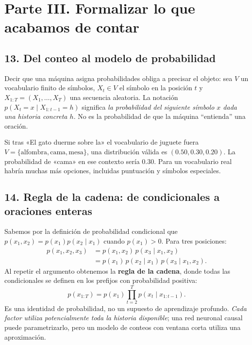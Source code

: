\chapter*{Parte III. Formalizar lo que acabamos de contar}
\section*{13. Del conteo al modelo de probabilidad}
Decir que una máquina asigna probabilidades obliga a precisar el objeto: sea $V$ un vocabulario finito de símbolos, $X_t\in V$ el símbolo en la posición $t$ y $X_{1:T}=(X_1,\ldots,X_T)$ una secuencia aleatoria. La notación $p(X_t=x\mid X_{1:t-1}=h)$ significa \emph{la probabilidad del siguiente símbolo $x$ dada una historia concreta $h$}. No es la probabilidad de que la máquina ``entienda'' una oración.

\begin{ejemplo}
Si tras «El gato duerme sobre la» el vocabulario de juguete fuera $V=\{\text{alfombra},\text{cama},\text{mesa}\}$, una distribución válida es $(0.50,0.30,0.20)$. La probabilidad de «cama» en ese contexto sería $0.30$. Para un vocabulario real habría muchas más opciones, incluidas puntuación y símbolos especiales.
\end{ejemplo}

\section*{14. Regla de la cadena: de condicionales a oraciones enteras}
Sabemos por la definición de probabilidad condicional que $p(x_1,x_2)=p(x_1)p(x_2\mid x_1)$ cuando $p(x_1)>0$. Para tres posiciones:
\begin{align*}
p(x_1,x_2,x_3)&=p(x_1,x_2)\,p(x_3\mid x_1,x_2)\\
&=p(x_1)\,p(x_2\mid x_1)\,p(x_3\mid x_1,x_2).
\end{align*}
Al repetir el argumento obtenemos la \textbf{regla de la cadena}, donde todas las condicionales se definen en los prefijos con probabilidad positiva:
\[
\boxed{\displaystyle p(x_{1:T})=p(x_1)\prod_{t=2}^T p(x_t\mid x_{1:t-1}).}
\]
Es una identidad de probabilidad, no un supuesto de aprendizaje profundo. \emph{Cada factor utiliza potencialmente toda la historia disponible}; una red neuronal causal puede parametrizarlo, pero un modelo de conteos con ventana corta utiliza una aproximación.

